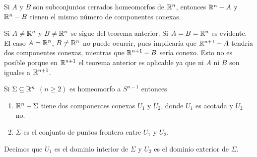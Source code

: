 \documentclass[CV.tex]{subfiles}
\begin{document}
\begin{coro}\label{7.9}
Si $A$ y $B$ son subconjuntos cerrados homeomorfos de $\mathbb{R}^n$, entonces $\mathbb{R}^n-A$ y $\mathbb{R}^n-B$ tienen el mismo número de componentes conexas. 
\end{coro}
\begin{dem}
Si $A\neq\mathbb{R}^n$ y $B\neq\mathbb{R}^n$ se sigue del teorema anterior. Si $A=B=\mathbb{R}^n$ es evidente. El caso $A=\mathbb{R}^n$, $B\neq\mathbb{R}^n$ no puede ocurrir, pues implicaría que $\mathbb{R}^{n+1}-A$ tendría dos componentes conexas, mientras que $\mathbb{R}^{n+1}-B$ sería conexo. Esto no es posible porque en $\mathbb{R}^{n+1}$ el teorema anterior es aplicable ya que ni $A$ ni $B$ son iguales a $\mathbb{R}^{n+1}$. \QED 
\end{dem}

\begin{teorema}\label{jordan}
Si $\Sigma\subseteq\mathbb{R}^n$ $(n\geq 2)$ es homeomorfo a $S^{n-1}$ entonces
\begin{enumerate}
\item $\mathbb{R}^n-\Sigma$ tiene dos componentes conexas $U_1$ y $U_2$, donde $U_1$ es acotada y $U_2$ no.
\item $\Sigma$ es el conjunto de puntos frontera entre $U_1$ y $U_2$.
\end{enumerate}
Decimos que $U_1$ es el dominio interior de $\Sigma$ y $U_2$ es el dominio exterior de $\Sigma$.
\end{teorema}
\end{document}
